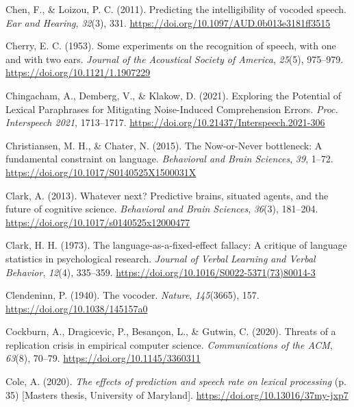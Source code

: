 \documentclass[a4paper, nobind]{templates/ociamthesis}
\newlength{\cslhangindent}
\newenvironment{CSLReferences}[2] %
 {%
  \setlength{\parindent}{0pt}
  \ifodd #1
  \let\oldpar\par
  \def\par{\hangindent=\cslhangindent\oldpar}
  \fi
  \setlength{\parskip}{1mm}
  \setlength{\baselineskip}{6mm}
 }%
 {}
\begin{document}
\begin{CSLReferences}{1}{0}
\leavevmode{}%
Chen, F., \& Loizou, P. C. (2011). Predicting the intelligibility of vocoded speech. \emph{Ear and Hearing}, \emph{32}(3), 331. \url{https://doi.org/10.1097/AUD.0b013e3181ff3515}

\leavevmode{}%
Cherry, E. C. (1953). {Some experiments on the recognition of speech, with one and with two ears}. \emph{Journal of the Acoustical Society of America}, \emph{25}(5), 975--979. \url{https://doi.org/10.1121/1.1907229}

\leavevmode{}%
Chingacham, A., Demberg, V., \& Klakow, D. (2021). {Exploring the Potential of Lexical Paraphrases for Mitigating Noise-Induced Comprehension Errors}. \emph{Proc. Interspeech 2021}, 1713--1717. \url{https://doi.org/10.21437/Interspeech.2021-306}

\leavevmode{}%
Christiansen, M. H., \& Chater, N. (2015). {The Now-or-Never bottleneck: A fundamental constraint on language}. \emph{Behavioral and Brain Sciences}, \emph{39}, 1--72. \url{https://doi.org/10.1017/S0140525X1500031X}

\leavevmode{}%
Clark, A. (2013). Whatever next? Predictive brains, situated agents, and the future of cognitive science. \emph{Behavioral and Brain Sciences}, \emph{36}(3), 181--204. \url{https://doi.org/10.1017/s0140525x12000477}

\leavevmode{}%
Clark, H. H. (1973). {The language-as-a-fixed-effect fallacy: A critique of language statistics in psychological research}. \emph{Journal of Verbal Learning and Verbal Behavior}, \emph{12}(4), 335--359. \url{https://doi.org/10.1016/S0022-5371(73)80014-3}

\leavevmode{}%
Clendeninn, P. (1940). {The vocoder}. \emph{Nature}, \emph{145}(3665), 157. \url{https://doi.org/10.1038/145157a0}

\leavevmode{}%
Cockburn, A., Dragicevic, P., Besançon, L., \& Gutwin, C. (2020). {Threats of a replication crisis in empirical computer science}. \emph{Communications of the ACM}, \emph{63}(8), 70--79. \url{https://doi.org/10.1145/3360311}

\leavevmode{}%
Cole, A. (2020). \emph{{The effects of prediction and speech rate on lexical processing}} (p. 35) {[}Masters thesis, University of Maryland{]}. \url{https://doi.org/10.13016/37my-jxp7}


\end{CSLReferences}
\end{document}
